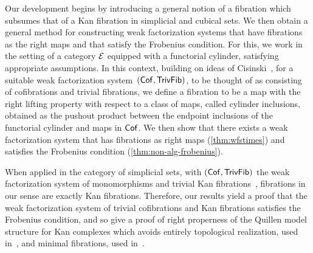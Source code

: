\documentclass[reqno,10pt,a4paper,oneside,draft]{amsart}
\begin{document}
Our development begins by introducing a general notion of a fibration which subsumes that of a Kan fibration in simplicial and cubical sets. We then obtain a general method for constructing weak factorization systems that have  fibrations as the right maps and that satisfy the Frobenius condition. For this, we work in the setting of a category $\cal{E}$  equipped with a functorial cylinder, satisfying appropriate assumptions. In this context, building on ideas of Cisinski~\cite{cisinski-asterisque}, for a suitable weak factorization system~$(\Cof, \TrivFib)$, to be thought of as consisting of cofibrations and trivial fibrations, we  define a fibration to be a map
with the right lifting property with respect to a class of maps, called cylinder inclusions, obtained as the pushout product between the endpoint inclusions of
the functorial cylinder and maps in $\Cof$. We then show that there exists a weak factorization system that has fibrations as right maps (\cref{thm:wfstimes}) and 
satisfies the Frobenius condition
(\cref{thm:non-alg-frobenius}).  

When applied in the category of simplicial sets, with $(\Cof, \TrivFib)$ the weak factorization system of monomorphisms and trivial Kan fibrations~\cite{quillen-homotopical}, fibrations
in our sense are exactly Kan fibrations. Therefore, our results yield a proof that the weak factorization system of trivial cofibrations and Kan fibrations satisfies the Frobenius condition, 
and so give a proof of right properness of the Quillen model structure for Kan complexes which avoids entirely topological realization, used in~\cite{hovey-model-categories}, 
 and minimal fibrations, used in~\cite{joyal-tierney:simplicial-homotopy-theory}.
\end{document}
